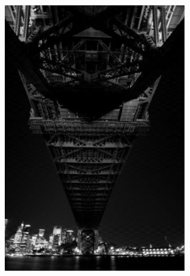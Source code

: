 \documentclass[12pt]{article}
\begin{document}
\begin{figure}[htbp]
{\includegraphics[width=8cm]{bridge-0100.eps}}
\hspace{5mm}
\end{figure} \\
\end{document}
